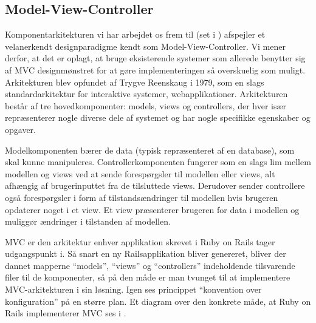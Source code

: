 \subsection{Model-View-Controller}
\label{subsec:mvc}
Komponentarkitekturen vi har arbejdet os frem til (set i ) afspejler et velanerkendt designparadigme kendt som Model-View-Controller\cite{designpatterns}. Vi mener derfor, at det er oplagt, at bruge eksisterende systemer som allerede benytter sig af MVC designmønstret for at gøre implementeringen så overskuelig som muligt. Arkitekturen blev opfundet af Trygve Reenskaug i 1979, som en slags standardarkitektur for interaktive systemer, \fx webapplikationer. Arkitekturen består af tre hovedkomponenter: models, views og controllers, der hver især repræsenterer nogle diverse dele af systemet og har nogle specifikke egenskaber og opgaver.

Modelkomponenten bærer de data (typisk repræsenteret af en database), som skal kunne manipuleres. Controllerkomponenten fungerer som en slags lim mellem modellen og views ved at sende forespørgsler til modellen eller views, alt afhængig af brugerinputtet fra de tilsluttede views. Derudover sender controllere også forespørgsler i form af tilstandsændringer til modellen hvis brugeren \fx opdaterer noget i et view. Et view præsenterer brugeren for data i modellen og muliggør ændringer i tilstanden af modellen.


MVC er den arkitektur enhver applikation skrevet i Ruby on Rails tager udgangspunkt i. Så snart en ny Railsapplikation bliver genereret, bliver der dannet mapperne ``models'', ``views'' og ``controllers'' indeholdende tilsvarende filer til de komponenter, så på den måde er man tvunget til at implementere MVC-arkitekturen i sin løsning. Igen ses princippet ``konvention over konfiguration'' på en større plan. Et diagram over den konkrete måde, at Ruby on Rails implementerer MVC ses i .
